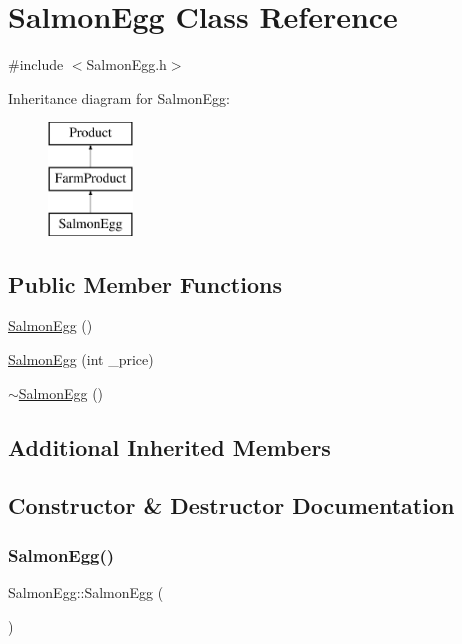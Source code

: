 \hypertarget{classSalmonEgg}{}\section{Salmon\+Egg Class Reference}
\label{classSalmonEgg}


{\ttfamily \#include $<$Salmon\+Egg.\+h$>$}

Inheritance diagram for Salmon\+Egg\+:\begin{figure}[H]
\begin{center}
\leavevmode
\includegraphics[height=3.000000cm]{classSalmonEgg}
\end{center}
\end{figure}
\subsection*{Public Member Functions}
\begin{DoxyCompactItemize}
\item 
\mbox{\hyperlink{classSalmonEgg_a929d1371e61ce4d4e50adb6e21650d15}{Salmon\+Egg}} ()
\item 
\mbox{\hyperlink{classSalmonEgg_ab6a98f7fe773dde7c3c3425316ece63f}{Salmon\+Egg}} (int \+\_\+price)
\item 
\mbox{\hyperlink{classSalmonEgg_aac22a45e0439de30e247f6780b0e6f3e}{$\sim$\+Salmon\+Egg}} ()
\end{DoxyCompactItemize}
\subsection*{Additional Inherited Members}


\subsection{Constructor \& Destructor Documentation}
\mbox{\label{classSalmonEgg_a929d1371e61ce4d4e50adb6e21650d15}} 
\subsubsection{\texorpdfstring{SalmonEgg()}{SalmonEgg()}\hspace{0.1cm}{\footnotesize\ttfamily [1/2]}}
{\footnotesize\ttfamily Salmon\+Egg\+::\+Salmon\+Egg (\begin{DoxyParamCaption}{ }\end{DoxyParamCaption})}

